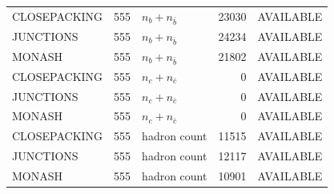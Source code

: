 \begin{landscape}
\begin{longtable}{@{}lrlrl@{}}
CLOSEPACKING & 555 & $n_b+n_{\bar b}$ & \num{23030} & AVAILABLE \\
JUNCTIONS & 555 & $n_b+n_{\bar b}$ & \num{24234} & AVAILABLE \\
MONASH & 555 & $n_b+n_{\bar b}$ & \num{21802} & AVAILABLE \\
CLOSEPACKING & 555 & $n_c+n_{\bar c}$ & \num{0} & AVAILABLE \\
JUNCTIONS & 555 & $n_c+n_{\bar c}$ & \num{0} & AVAILABLE \\
MONASH & 555 & $n_c+n_{\bar c}$ & \num{0} & AVAILABLE \\
CLOSEPACKING & 555 & hadron count & \num{11515} & AVAILABLE \\
JUNCTIONS & 555 & hadron count & \num{12117} & AVAILABLE \\
MONASH & 555 & hadron count & \num{10901} & AVAILABLE \\
\end{longtable}
\end{landscape}
